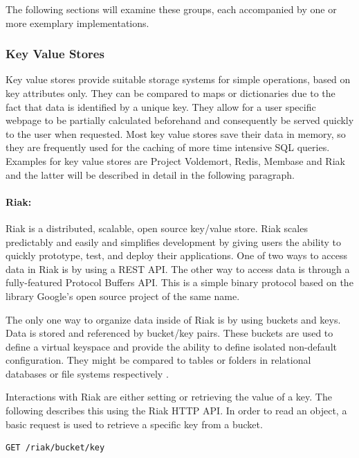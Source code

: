 The following sections will examine these groups, each accompanied by one or more exemplary implementations.      

\subsubsection{Key Value Stores}

Key value stores provide suitable storage systems for simple operations, based on key attributes only. They can be compared to maps or dictionaries due to the fact that data is identified by a unique key. They allow for a user specific webpage to be partially calculated beforehand and consequently be served quickly to the user when requested. Most key value stores save their data in memory, so they are frequently used for the caching of more time intensive \ac{SQL} queries. Examples for key value stores are Project Voldemort, Redis, Membase and Riak and the latter will be described in detail in the following paragraph.

\paragraph{Riak:} Riak is a distributed, scalable, open source key/value store. Riak scales predictably and easily and simplifies development by giving users the ability to quickly prototype, test, and deploy their applications. One of two ways to access data in Riak is by using a \ac{REST} \ac{API}. The other way to access data is through a fully-featured Protocol Buffers \ac{API}. This is a simple binary protocol based on the library Google's open source project of the same name.

The only one way to organize data inside of Riak is by using buckets and keys. Data is stored and referenced by bucket/key pairs. These buckets are used to define a virtual keyspace and provide the ability to define isolated non-default configuration. They might be compared to tables or folders in relational databases or file systems respectively \cite{Riak:Buckets}.

Interactions with Riak are either setting or retrieving the value of a key. The following describes this using the Riak \ac{HTTP} \ac{API}. In order to read an object, a basic request is used to retrieve a specific key from a bucket. 

\begin{code}
\begin{verbatim}
GET /riak/bucket/key
\end{verbatim}
\label{lst:riak_get}
\end{code}

